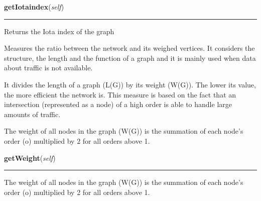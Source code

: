    \label{Epigrass:simobj:graph:getIotaindex}

    \vspace{0.5ex}

    \begin{boxedminipage}{\textwidth}

    \raggedright \textbf{getIotaindex}(\textit{self})

    \vspace{-1.5ex}

    \rule{\textwidth}{0.5\fboxrule}
    Returns the Iota index of the graph

    Measures the ratio between the network and its weighed vertices. It 
    considers the structure, the length and the function of a graph and it 
    is mainly used when data about traffic is not available.

    It divides the length of a graph (L(G)) by its weight (W(G)). The lower
    its value, the more efficient the network is. This measure is based on 
    the fact that an intersection (represented as a node) of a high order 
    is able to handle large amounts of traffic.

    The weight of all nodes in the graph (W(G)) is the summation of each 
    node's order (o) multiplied by 2 for all orders above 1.

    \vspace{1ex}

    \end{boxedminipage}

    \label{Epigrass:simobj:graph:getWeight}

    \vspace{0.5ex}

    \begin{boxedminipage}{\textwidth}

    \raggedright \textbf{getWeight}(\textit{self})

    \vspace{-1.5ex}

    \rule{\textwidth}{0.5\fboxrule}
    The weight of all nodes in the graph (W(G)) is the summation of each 
    node's order (o) multiplied by 2 for all orders above 1.

    \vspace{1ex}

    \end{boxedminipage}

